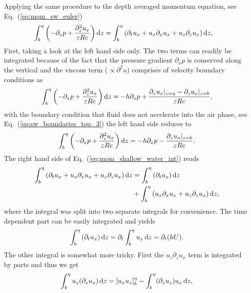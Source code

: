Applying the same procedure to the depth averaged momentum equation, see Eq.~(\ref{eq:mom_sw_euler})
\begin{align}\label{eq:mom_shallow_water_int}
    \int_b^{\eta}\left(-\partial_x p + \frac{\partial_z^2 u_x}{\varepsilon Re}\right)\mathop{}\!\mathrm{d} z &= \int_b^{\eta}\left(\partial_t u_x + u_x\partial_x u_x + u_z\partial_{z} u_x\right)\mathop{}\!\mathrm{d} z, 
\end{align}
First, taking a look at the left hand side only. 
The two terms can readily be integrated because of the fact that the pressure gradient $\partial_x p$ is conserved along the vertical and the viscous term ($\propto\partial^2 u$) comprises of velocity boundary conditions as
\begin{equation}\label{eq:sw_mom_left}
    \int_b^{\eta}\left(-\partial_x p + \frac{\partial_z^2 u_x}{\varepsilon Re}\right)\mathop{}\!\mathrm{d} z = -h\partial_x p + \frac{\partial_z u_x|_{z = \eta} - \partial_z u_x|_{z=b}}{\varepsilon Re},
\end{equation}
with the boundary condition that fluid does not accelerate into the air phase, see Eq.~(\ref{eq:sw_boundaries_top_3}) the left hand side reduces to
\begin{equation}
    \int_b^{\eta}\left(-\partial_x p + \frac{\partial_z^2 u_x}{\varepsilon Re}\right)\mathop{}\!\mathrm{d} z = -h\partial_x p - \frac{\partial_z u_x|_{z=b}}{\varepsilon Re}.
\end{equation}
The right hand side of Eq.~(\ref{eq:mom_shallow_water_int}) reads
\begin{align}
    \int_b^{\eta}\left(\partial_t u_x + u_x\partial_x u_x + u_z\partial_{z} u_x\right)\mathop{}\!\mathrm{d} z &= \int_b^{\eta}\left(\partial_t u_x\right)\mathop{}\!\mathrm{d} z \\
    &+ \int_b^{\eta}\left(u_x\partial_x u_x + u_z\partial_{z} u_x\right)\mathop{}\!\mathrm{d} z ,
\end{align}
where the integral was split into two separate integrals for convenience.
The time dependent part can be easily integrated and yields
\begin{equation}\label{eq:first_term_rhs_mom_sw}
    \int_b^{\eta}\left(\partial_t u_x\right)\mathop{}\!\mathrm{d} z = \partial_t \int_b^{\eta} u_x \mathop{}\!\mathrm{d} z = \partial_t(hU). 
\end{equation}
The other integral is somewhat more tricky.
First the $u_z\partial_z u_x$ term is integrated by parts and thus we get
\begin{equation}
    \int_b^{\eta}u_z(\partial_{z} u_x)\mathop{}\!\mathrm{d} z = [u_x u_z]_b^{\eta} - \int_b^{\eta} (\partial_z u_z) u_x \mathop{}\!\mathrm{d} z,
\end{equation}
